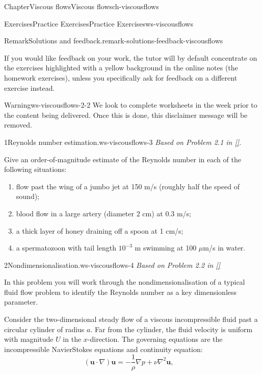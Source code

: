 \documentclass[oneside,10pt,]{book}
\newcommand{\xreffont}{\relax}
\numberwithin{equation}{section}
\newcommand{\bu}{\boldsymbol{u}}
\begin{document}
\begin{chapterptx}{Chapter}{Viscous flows}{}{Viscous flows}{}{}{ch-viscousflows}
\begin{exercises-section}{Exercises}{Practice Exercises}{}{Practice Exercises}{}{}{ws-viscousflows}
\begin{introduction}{}
\begin{remark}{Remark}{Solutions and feedback.}{remark-solutions-feedback-viscousflows}
\par
If you would like feedback on your work, the tutor will by default concentrate on the exercises highlighted with a yellow background in the online notes (the homework exercises), unless you specifically ask for feedback on a different exercise instead.%
\end{remark}
\begin{warning}{Warning}{}{ws-viscousflows-2-2}%
We look to complete worksheets in the week prior to the content being delivered. Once this is done, this disclaimer message will be removed.%
\end{warning}
\end{introduction}%
\begin{divisionexercise}{1}{Reynolds number estimation.}{}{ws-viscousflows-3}%
\emph{Based on Problem 2.1 in \hyperlink{ref-acheson}{[{\xreffont 4}]}.}%
 \par
Give an order-of-magnitude estimate of the Reynolds number in each of the following situations:%
\begin{enumerate}[font=\bfseries,label=(\alph*),ref=\alph*]%
\item{}flow past the wing of a jumbo jet at 150 m\slash{}s (roughly half the speed of sound);%
\item{}blood flow in a large artery (diameter 2 cm) at 0.3 m\slash{}s;%
\item{}a thick layer of honey draining off a spoon at 1 cm\slash{}s;%
\item{}a spermatozoon with tail length \(10^{-3}\) m swimming at 100 \(\mu\)m\slash{}s in water.%
\end{enumerate}%
\end{divisionexercise}%
\begin{divisionexercise}{2}{Nondimensionalisation.}{}{ws-viscousflows-4}%
\emph{Based on Problem 2.2 in \hyperlink{ref-acheson}{[{\xreffont 4}]}}%
 \par
In this problem you will work through the nondimensionalisation of a typical fluid flow problem to identify the Reynolds number as a key dimensionless parameter.%
 \par
Consider the two-dimensional steady flow of a viscous incompressible fluid past a circular cylinder of radius \(a\). Far from the cylinder, the fluid velocity is uniform with magnitude \(U\) in the \(x\)-direction. The governing equations are the incompressible Navier\textendash{}Stokes equations and continuity equation:%
\begin{equation*}
\left(\bu\cdot\nabla\right)\bu=-\frac{1}{\rho}\nabla p+\nu\nabla^2\bu,\quad

\end{equation*}
\end{divisionexercise}
\end{exercises-section}
\end{chapterptx}
\end{document}
